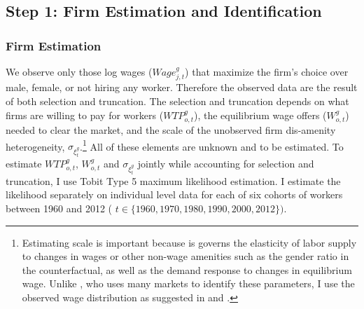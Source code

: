 \documentclass[12pt]{article}
\begin{document}





\subsection{Step 1: Firm Estimation and Identification}

\subsubsection{Firm Estimation}

We observe only those log wages ($Wage^g_{j,t}$) that maximize the firm's choice over male, female, or not hiring any worker. Therefore the observed data are the result of both selection and truncation. The selection and truncation depends on what firms are willing to pay for workers ($WTP^g_{o,t}$), the equilibrium wage offers ($W^g_{o,t}$) needed to clear the market, and the scale of the unobserved firm dis-amenity heterogeneity, $\sigma_{\xi^g_t} $.\footnote{Estimating scale is important because is governs the elasticity of labor supply to changes in wages or other non-wage amenities such as the gender ratio in the counterfactual, as well as the demand response to changes in equilibrium wage. Unlike , who uses many markets to identify these parameters, I use the observed wage distribution as suggested in  and .} All of these elements are unknown and to be estimated. To estimate $WTP^g_{o,t}$, $W^g_{o,t}$ and $\sigma_{\xi^g_t} $ jointly while accounting for selection and truncation, I use Tobit Type 5 maximum likelihood estimation. I estimate the likelihood separately on individual level data for each of six cohorts of workers between 1960 and 2012 ( $t \in \{1960,1970,1980,1990,2000,2012\} )$.


\end{document}
